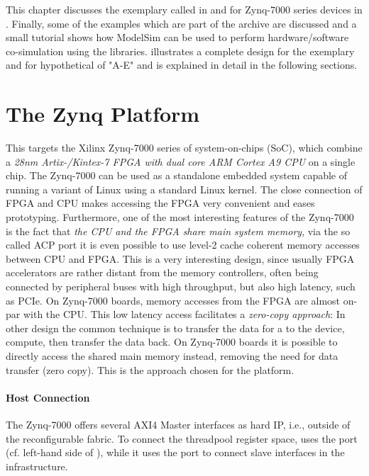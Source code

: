 This chapter discusses the exemplary  called  in  and  for Zynq-7000 series devices  in .
Finally, some of the examples which are part of the \tpc{} archive are discussed and a small tutorial shows how ModelSim can be used to perform hardware/software co-simulation using the \tpc{} libraries.
 illustrates a complete design for the exemplary  and  for hypothetical  of  "A-E" and is explained in detail in the following sections.

\section{The Zynq Platform}\label{sec:zynq-platform}
This  targets the Xilinx Zynq-7000 series of system-on-chips (SoC), which combine a \emph{28nm Artix-/Kintex-7 FPGA with dual core ARM Cortex A9 CPU} on a single chip.
The Zynq-7000 can be used as a standalone embedded system capable of running a variant of Linux using a standard Linux kernel.
The close connection of FPGA and CPU makes accessing the FPGA very convenient and eases prototyping.
Furthermore, one of the most interesting features of the Zynq-7000 is the fact that \emph{the CPU and the FPGA share main system memory}, via the so called ACP port it is even possible to use level-2 cache coherent memory accesses between CPU and FPGA.
This is a very interesting design, since usually FPGA accelerators are rather distant from the memory controllers, often being connected by peripheral buses with high throughput, but also high latency, such as PCIe.
On Zynq-7000 boards, memory accesses from the FPGA are almost on-par with the CPU.
This low latency access facilitates a \emph{zero-copy approach}:
In other design the common technique is to transfer the data for a  to the device, compute, then transfer the data back.
On Zynq-7000 boards it is possible to directly access the shared main memory instead, removing the need for data transfer (zero copy).
This is the approach chosen for the  platform.

\paragraph{Host Connection}
The Zynq-7000 offers several AXI4 Master interfaces as hard IP, i.e., outside of the reconfigurable fabric.
To connect the threadpool register space,  uses the  port (cf. left-hand side of ), while it uses the  port to connect slave interfaces in the  infrastructure.

